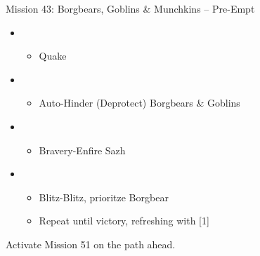 \begin{battle}{{Mission 43: Borgbears, Goblins \& Munchkins -- Pre-Empt}}
	\begin{itemize}
		\item \second
			\begin{itemize}
				\item Quake
			\end{itemize}
		\item \sixth
			\begin{itemize}
				\item Auto-Hinder (Deprotect) Borgbears \& Goblins
			\end{itemize}
		\item \fifth
			\begin{itemize}
				\item Bravery-Enfire Sazh
			\end{itemize}
		\item \second
			\begin{itemize}
				\item Blitz-Blitz, prioritze Borgbear
				\item Repeat until victory, refreshing with [1]
			\end{itemize}
	\end{itemize}
\end{battle}

Activate Mission 51 on the path ahead.

